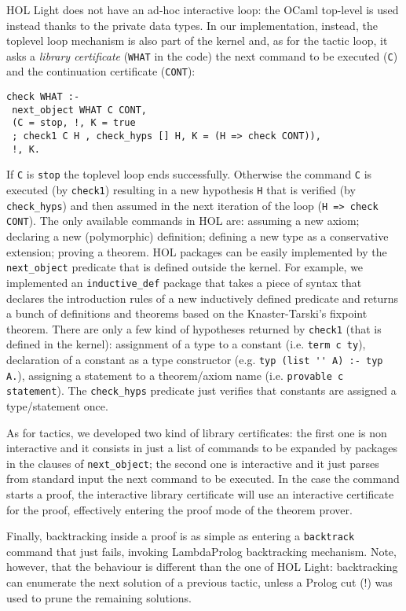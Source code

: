 \documentclass[preprint]{sigplanconf}
\begin{document}
HOL Light does not have an ad-hoc interactive loop: the OCaml top-level is used instead thanks to the private data types. In our implementation, instead, the toplevel loop mechanism is also part of the kernel and, as for the tactic loop, it asks a \emph{library certificate} (\verb+WHAT+ in the code) the next command to be executed
(\verb+C+) and the continuation certificate (\verb+CONT+):

{\small
\begin{verbatim}
check WHAT :-
 next_object WHAT C CONT,
 (C = stop, !, K = true
 ; check1 C H , check_hyps [] H, K = (H => check CONT)),
 !, K.
\end{verbatim}
}

If \verb+C+ is \verb+stop+ the toplevel loop ends successfully. Otherwise the command \verb+C+ is executed (by \verb+check1+) resulting in a new hypothesis \verb+H+ that is verified (by \verb+check_hyps+) and then assumed in the next iteration of the loop (\verb+H => check CONT+). The only available commands in HOL are: assuming a new axiom; declaring a new (polymorphic) definition; defining a new type as a conservative extension; proving a theorem. HOL packages can be easily implemented by the \verb+next_object+ predicate that is defined outside the kernel. For example, we implemented an \verb+inductive_def+ package that takes a piece of syntax that declares the introduction rules of a new inductively defined predicate and returns a bunch of definitions and theorems based on the Knaster-Tarski's fixpoint theorem. There are only a few kind of hypotheses returned by \verb+check1+ (that is defined in the kernel): assignment of a type to a constant (i.e. \verb+term c ty+), declaration of a constant as a type constructor (e.g. \verb+typ (list '' A) :- typ A.+), assigning a statement to a theorem/axiom name (i.e. \verb+provable c statement+). The \verb+check_hyps+ predicate just verifies that constants are assigned a type/statement once.

As for tactics, we developed two kind of library certificates: the first one is non interactive and it consists in just a list of commands to be expanded by packages in the clauses of \verb+next_object+; the second one is interactive and it just parses from standard input the next command to be executed. In the case the command starts a proof, the interactive library certificate will use an interactive certificate for the proof, effectively entering the proof mode of the theorem prover.

Finally, backtracking inside a proof is as simple as entering a \verb+backtrack+ command that just fails, invoking LambdaProlog backtracking mechanism. Note, however, that the behaviour is different than the one of HOL Light: backtracking can enumerate the next solution of a previous tactic, unless a Prolog cut ($!$) was used to prune the remaining solutions.
\end{document}
